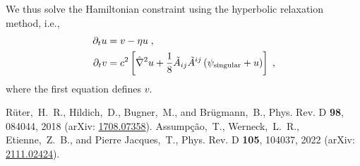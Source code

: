 We thus solve the Hamiltonian constraint using the hyperbolic relaxation method,
i.e.,
\begin{align}
  \partial_{t}u &= v - \eta u\;,\\
  \partial_{t}v &= c^{2}\left[\hat{\nabla}^{2}u + \frac{1}{8}\tilde{A}_{ij}\tilde{A}^{ij}\left(\psi_{\rm singular} + u\right)\right]\;,
\end{align}
where the first equation defines $v$.

\begin{thebibliography}{9}
   Rüter,~H.~R., Hildich,~D., Bugner,~M., and Brügmann,~B., Phys. Rev. D \textbf{98}, 084044, 2018 (arXiv: \href{https://arxiv.org/abs/1708.07358}{1708.07358}).
   Assumpção,~T., Werneck,~L.~R., Etienne,~Z.~B., and Pierre Jacques,~T., Phys. Rev. D \textbf{105}, 104037, 2022 (arXiv: \href{https://arxiv.org/abs/2111.02424}{2111.02424}).
\end{thebibliography}




